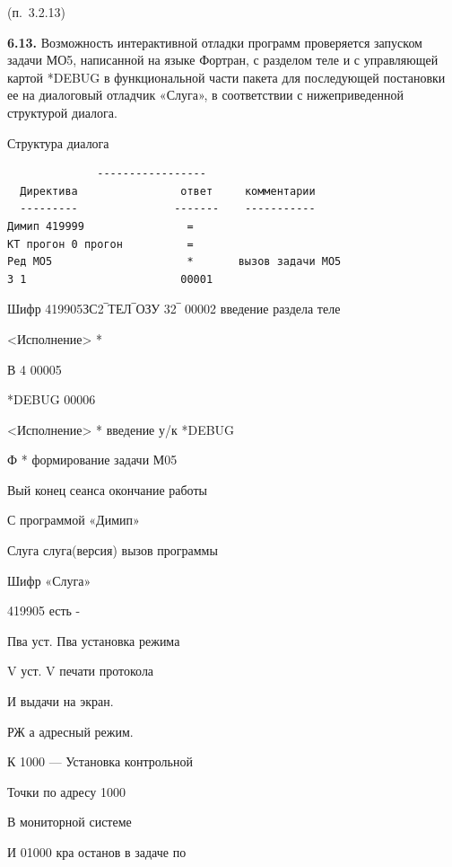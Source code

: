 \documentclass[11pt,a4paper]{article}
\begin{document}
\begin{center}(п.~3.2.13)\end{center}
\par\textbf{6.13.} Возможность интерактивной отладки программ проверяется запуском задачи МО5, написанной на языке Фортран, с разделом теле и с управляющей картой *DEBUG в функциональной части пакета для последующей постановки ее на диалоговый отладчик «Слуга», в соответствии с нижеприведенной структурой диалога.\par
\begin{center}Структура диалога\end{center}
\begin{center}\small
\begin{BVerbatim}
              -----------------
  Директива                ответ     комментарии
  ---------               -------    -----------
Димип 419999                =
КТ прогон 0 прогон          =
Ред МО5                     *       вызов задачи МО5
З 1                        00001
\end{BVerbatim}
\end{center}

Шифр 419905ЗС2‾ТЕЛ‾ОЗУ 32‾ 00002 введение раздела теле

<Исполнение> *

В 4 00005

*DEBUG 00006

<Исполнение> * введение у/к *DEBUG

Ф * формирование задачи М05

Вый конец сеанса окончание работы

\begin{center}С программой «Димип»\end{center}
Слуга слуга(версия) вызов программы

\begin{center}Шифр «Слуга»\end{center}
419905 есть -

Пва уст. Пва установка режима

V уст. V печати протокола

\begin{center}И выдачи на экран.\end{center}
РЖ а адресный режим.

К 1000 --- Установка контрольной

\begin{center}Точки по адресу 1000\end{center}
\begin{center}В мониторной системе\end{center}
И 01000 кра останов в задаче по
\end{document}
